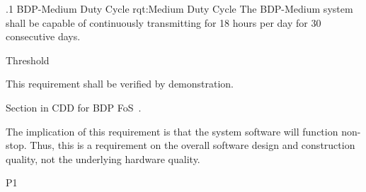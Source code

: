 \ONERQMTVKSA
{\RqtNumberBase.1}
{BDP-Medium Duty Cycle}
{rqt:Medium Duty Cycle}
{The BDP-Medium system shall be capable of continuously transmitting for 18 hours per day for 30 consecutive days.}
{
	\item [Phase 1] Threshold
}
{This requirement shall be verified by demonstration.}
{
\item [5.5.14.1] Section in CDD for BDP FoS~\cite{ref__BDP_FOS_CDD}.
}
{
	\item The implication of this requirement is that the system software will function non-stop. Thus, this is a requirement on the overall software design and construction quality, not the underlying hardware quality.
}
{P1}

